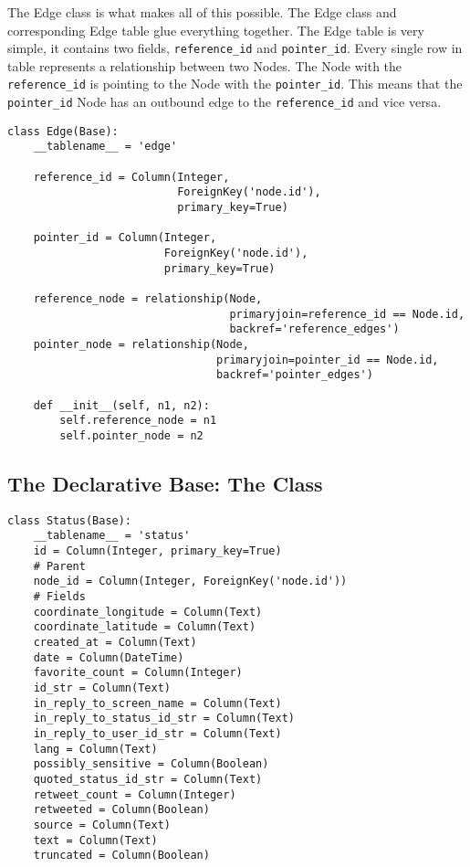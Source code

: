The Edge class is what makes all of this possible. The Edge class and corresponding Edge table glue everything together. The Edge table is very simple, it contains two fields, \verb|reference_id| and \verb|pointer_id|. Every single row in table represents a relationship between two Nodes. The Node with the \verb|reference_id| is pointing to the Node with the \verb|pointer_id|. This means that the \verb|pointer_id| Node has an outbound edge to the \verb|reference_id| and vice versa.

\begin{lstlisting}
class Edge(Base):
    __tablename__ = 'edge'

    reference_id = Column(Integer,
                          ForeignKey('node.id'),
                          primary_key=True)

    pointer_id = Column(Integer,
                        ForeignKey('node.id'),
                        primary_key=True)

    reference_node = relationship(Node,
                                  primaryjoin=reference_id == Node.id,
                                  backref='reference_edges')
    pointer_node = relationship(Node,
                                primaryjoin=pointer_id == Node.id,
                                backref='pointer_edges')

    def __init__(self, n1, n2):
        self.reference_node = n1
        self.pointer_node = n2
\end{lstlisting}


\subsection{The Declarative Base: The  Class}
\begin{lstlisting}
class Status(Base):
    __tablename__ = 'status'
    id = Column(Integer, primary_key=True)
    # Parent
    node_id = Column(Integer, ForeignKey('node.id'))
    # Fields
    coordinate_longitude = Column(Text)
    coordinate_latitude = Column(Text)
    created_at = Column(Text)
    date = Column(DateTime)
    favorite_count = Column(Integer)
    id_str = Column(Text)
    in_reply_to_screen_name = Column(Text)
    in_reply_to_status_id_str = Column(Text)
    in_reply_to_user_id_str = Column(Text)
    lang = Column(Text)
    possibly_sensitive = Column(Boolean)
    quoted_status_id_str = Column(Text)
    retweet_count = Column(Integer)
    retweeted = Column(Boolean)
    source = Column(Text)
    text = Column(Text)
    truncated = Column(Boolean)
\end{lstlisting}


